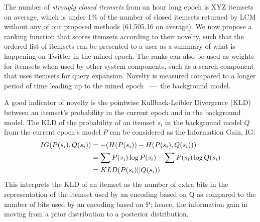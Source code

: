 \documentclass[letterpaper,12pt,titlepage,oneside,final]{book}
\begin{document}
The number of \emph{strongly closed itemsets} from an hour long epoch is XYZ itemsets on average, 
which is under 1\% of the number of closed itemsets returned by LCM 
without any of our proposed methods (61,505.16 on average).
We now propose a ranking function that scores itemsets 
according to their novelty,
such that the ordered list of itemsets 
can be presented to a user as a summary of 
what is happening on Twitter in the mined epoch.
The ranks can also be used as weights for itemsets when
used by other system components, 
such as a search component that uses itemsets for query expansion.
Novelty is measured compared to %
a longer period of time 
leading up to the mined epoch
~---~the background model.

A good indicator of novelty is the pointwise Kullback-Leibler Divergence (KLD)
between an itemset's probability in the current epoch and in the background model.
The KLD of the probability of an itemset $s_i$ in the background
model $Q$ from the current epoch's model $P$ can be considered as
the Information Gain, IG: 
\begin{align}IG(P(s_i),Q(s_i))  &= - (H(P(s_i)) - H(P(s_i),Q(s_i))) \notag\\ &= \sum{P(s_i) \log{P(s_i)}} - \sum{P(s_i) \log{Q(s_i)}} \notag\\ &= KLD(P(s_i)||Q(s_i))\end{align}
This interprets the KLD of an itemset as the number of extra bits
in the representation of the itemset
used by an encoding based on Q as compared to the number of bits
used by an encoding based on P; 
hence, the information gain in moving from a prior distribution to 
a posterior distribution.
\end{document}
